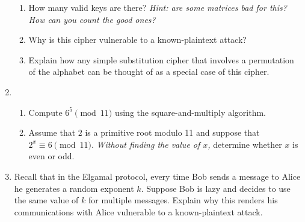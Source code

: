 \documentclass[11pt,letterpaper]{article}
\begin{document}
\begin{enumerate}
\begin{enumerate}
        \item How many valid keys are there? \emph{Hint: are some matrices bad for this? How can you count the good ones?}

        \item Why is this cipher vulnerable to a known-plaintext attack?

        \item Explain how any simple substitution cipher that involves a permutation of the alphabet can be thought of as a special case of this cipher.

    \end{enumerate}

    \item \begin{enumerate}
        \item Compute $6^5\pmod{11}$ using the square-and-multiply algorithm.

        \item Assume that $2$ is a primitive root modulo 11 and suppose that $2^x \equiv 6\pmod{11}$.
        \emph{Without finding the value of $x$,} determine whether $x$ is even or odd.
    \end{enumerate}

    \item Recall that in the Elgamal protocol, every time Bob sends a message to Alice he generates a random exponent $k$.
    Suppose Bob is lazy and decides to use the same value of $k$ for multiple messages.
    Explain why this renders his communications with Alice vulnerable to a known-plaintext attack.

\end{enumerate}
\end{document}
